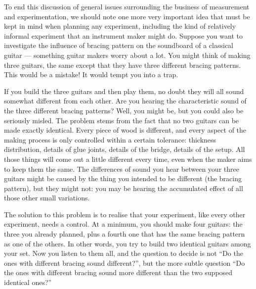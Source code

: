   To end this discussion of general issues surrounding the business of 
  measurement and experimentation, we should note one more very important idea 
  that must be kept in mind when planning any experiment, including the kind of 
  relatively informal experiment that an instrument maker might do. Suppose you 
  want to investigate the influence of bracing pattern on the soundboard of a 
  classical guitar — something guitar makers worry about a lot. You might think 
  of making three guitars, the same except that they have three different 
  bracing patterns. This would be a mistake! It would tempt you into a trap. 

  If you build the three guitars and then play them, no doubt they will all 
  sound somewhat different from each other. Are you hearing the characteristic 
  sound of the three different bracing patterns? Well, you might be, but you 
  could also be seriously misled. The problem stems from the fact that no two 
  guitars can be made exactly identical. Every piece of wood is different, and 
  every aspect of the making process is only controlled within a certain 
  tolerance: thickness distribution, details of glue joints, details of the 
  bridge, details of the setup. All those things will come out a little 
  different every time, even when the maker aims to keep them the same. The 
  differences of sound you hear between your three guitars might be caused by 
  the thing you intended to be different (the bracing pattern), but they might 
  not: you may be hearing the accumulated effect of all those other small 
  variations. 

  The solution to this problem is to realise that your experiment, like every 
  other experiment, needs a control. At a minimum, you should make four 
  guitars: the three you already planned, plus a fourth one that has the same 
  bracing pattern as one of the others. In other words, you try to build two 
  identical guitars among your set. Now you listen to them all, and the 
  question to decide is not “Do the ones with different bracing sound 
  different?”, but the more subtle question “Do the ones with different bracing 
  sound more different than the two supposed identical ones?” 

